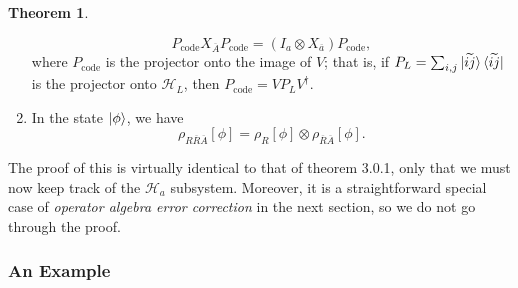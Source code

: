 \documentclass[12pt,a4paper]{report}
\numberwithin{equation}{section}
\newcommand{\ketbra}[2]{\ket{#1}\bra{#2}}
\newcommand{\ketbras}[1]{\ketbra{#1}{#1}}
\newcommand{\Pc}{P_{\text{code}}}
\newcommand{\ol}[1]{\overline{#1}}
\theoremstyle{definition}
\theoremstyle{theorem}
\newtheorem{theorem}{Theorem}[section]
\theoremstyle{theorem}
\theoremstyle{example}
\theoremstyle{definition}
\begin{document}
\begin{theorem}
\begin{enumerate}
		\begin{equation}\label{S3}
			\Pc X_{\ol{A}}\Pc=(I_{a}\otimes X_{\ol{a}})\Pc,
		\end{equation}
		where $\Pc$ is the projector onto the image of $V$; that is, if $P_{L}=\sum_{i,j}\ketbras{\widetilde{ij}}$ is the projector onto $\mathcal{H}_{L}$, then $\Pc=VP_{L}V^{\dagger}$.
		\item In the state $\ket{\phi}$, we have
		\begin{equation}\label{S4}
			\rho_{R\ol{R}\ol{A}}[\phi]=\rho_{R}[\phi]\otimes\rho_{\ol{R}\ol{A}}[\phi].
		\end{equation}
	\end{enumerate}
\end{theorem}
The proof of this is virtually identical to that of theorem 3.0.1, only that we must now keep track of the $\mathcal{H}_{a}$ subsystem. Moreover, it is a straightforward special case of \textit{operator algebra error correction} in the next section, so we do not go through the proof.
\subsubsection{An Example}
\end{document}
